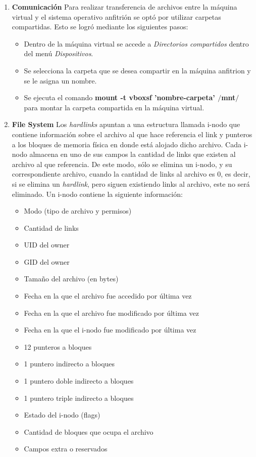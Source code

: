 \documentclass[a4paper,11pt] {article}
\begin{document}
\begin{enumerate}
  \item \textbf{Comunicaci\'on}
    Para realizar transferencia de archivos entre la m\'aquina virtual y el sistema operativo anfitri\'on se opt\'o por utilizar carpetas compartidas. Esto se logr\'o mediante los siguientes pasos:
    \begin{itemize}
      \item Dentro de la m\'aquina virtual se accede a \textit{Directorios compartidos} dentro del men\'u \textit{Dispositivos}.
      \item Se selecciona la carpeta que se desea compartir en la m\'aquina anfitrion y se le asigna un nombre.
      \item Se ejecuta el comando \textbf{mount -t vboxsf 'nombre-carpeta' $/$mnt$/$} para montar la carpeta compartida en la m\'aquina virtual.
    \end{itemize}

  \item \textbf{File System}
    Los \textit{hardlinks} apuntan a una estructura llamada i-nodo que contiene información sobre el archivo al que hace referencia el link y punteros a los bloques de memoria física en donde está alojado dicho archivo. Cada i-nodo almacena en uno de sus campos la cantidad de links que existen al archivo al que referencia. De este modo, sólo se elimina un i-nodo, y su correspondiente archivo, cuando la cantidad de links al archivo es 0, es decir, si se elimina un \textit{hardlink}, pero siguen existiendo links al archivo, este no será eliminado.
    Un i-nodo contiene la siguiente información:
    \begin{itemize}
      \item Modo (tipo de archivo y permisos)
      \item Cantidad de links
      \item UID del owner
      \item GID del owner
      \item Tamaño del archivo (en bytes)
      \item Fecha en la que el archivo fue accedido por última vez
      \item Fecha en la que el archivo fue modificado por última vez
      \item Fecha en la que el i-nodo fue modificado por última vez
      \item 12 punteros a bloques
      \item 1 puntero indirecto a bloques
      \item 1 puntero doble indirecto a bloques
      \item 1 puntero triple indirecto a bloques
      \item Estado del i-nodo (flags)
      \item Cantidad de bloques que ocupa el archivo
      \item Campos extra o reservados
    \end{itemize}


\end{enumerate}
\end{document}
